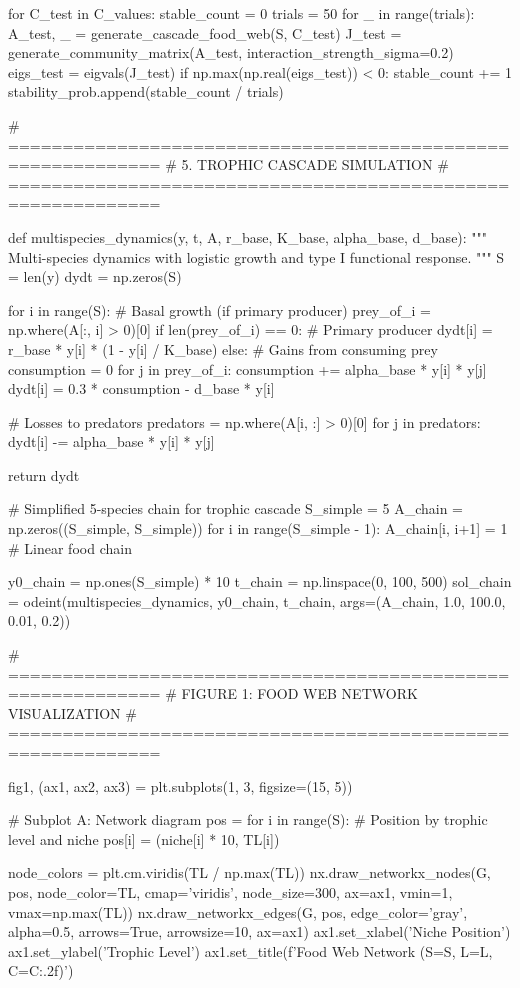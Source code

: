 \documentclass[a4paper, 11pt]{article}
\begin{document}
\begin{pycode}
for C_test in C_values:
    stable_count = 0
    trials = 50
    for _ in range(trials):
        A_test, _ = generate_cascade_food_web(S, C_test)
        J_test = generate_community_matrix(A_test, interaction_strength_sigma=0.2)
        eigs_test = eigvals(J_test)
        if np.max(np.real(eigs_test)) < 0:
            stable_count += 1
    stability_prob.append(stable_count / trials)

# ============================================================
# 5. TROPHIC CASCADE SIMULATION
# ============================================================

def multispecies_dynamics(y, t, A, r_base, K_base, alpha_base, d_base):
    """
    Multi-species dynamics with logistic growth and type I functional response.
    """
    S = len(y)
    dydt = np.zeros(S)

    for i in range(S):
        # Basal growth (if primary producer)
        prey_of_i = np.where(A[:, i] > 0)[0]
        if len(prey_of_i) == 0:  # Primary producer
            dydt[i] = r_base * y[i] * (1 - y[i] / K_base)
        else:
            # Gains from consuming prey
            consumption = 0
            for j in prey_of_i:
                consumption += alpha_base * y[i] * y[j]
            dydt[i] = 0.3 * consumption - d_base * y[i]

        # Losses to predators
        predators = np.where(A[i, :] > 0)[0]
        for j in predators:
            dydt[i] -= alpha_base * y[i] * y[j]

    return dydt

# Simplified 5-species chain for trophic cascade
S_simple = 5
A_chain = np.zeros((S_simple, S_simple))
for i in range(S_simple - 1):
    A_chain[i, i+1] = 1  # Linear food chain

y0_chain = np.ones(S_simple) * 10
t_chain = np.linspace(0, 100, 500)
sol_chain = odeint(multispecies_dynamics, y0_chain, t_chain,
                   args=(A_chain, 1.0, 100.0, 0.01, 0.2))

# ============================================================
# FIGURE 1: FOOD WEB NETWORK VISUALIZATION
# ============================================================

fig1, (ax1, ax2, ax3) = plt.subplots(1, 3, figsize=(15, 5))

# Subplot A: Network diagram
pos = {}
for i in range(S):
    # Position by trophic level and niche
    pos[i] = (niche[i] * 10, TL[i])

node_colors = plt.cm.viridis(TL / np.max(TL))
nx.draw_networkx_nodes(G, pos, node_color=TL, cmap='viridis',
                       node_size=300, ax=ax1, vmin=1, vmax=np.max(TL))
nx.draw_networkx_edges(G, pos, edge_color='gray', alpha=0.5,
                       arrows=True, arrowsize=10, ax=ax1)
ax1.set_xlabel('Niche Position')
ax1.set_ylabel('Trophic Level')
ax1.set_title(f'Food Web Network (S={S}, L={L}, C={C:.2f})')


\end{pycode}
\end{document}

